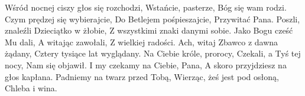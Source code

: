 \beginverse
Wśród nocnej ciszy głos się rozchodzi,
Wstańcie, pasterze, Bóg się wam rodzi.
Czym prędzej się wybierajcie,
Do Betlejem pośpieszajcie,
Przywitać Pana.
\endverse
\beginverse
Poszli, znaleźli Dzieciątko w żłobie,
Z wszystkimi znaki danymi sobie.
Jako Bogu cześć Mu dali,
A witając zawołali,
Z wielkiej radości.
\endverse
\beginverse
Ach, witaj Zbawco z dawna żądany,
Cztery tysiące lat wyglądany.
Na Ciebie króle, prorocy,
Czekali, a Tyś tej nocy,
Nam się objawił.
\endverse
\beginverse
I my czekamy na Ciebie, Pana,
A skoro przyjdziesz na głos kapłana.
Padniemy na twarz przed Tobą,
Wierząc, żeś jest pod osłoną,
Chleba i wina.
\endverse
\endsong
